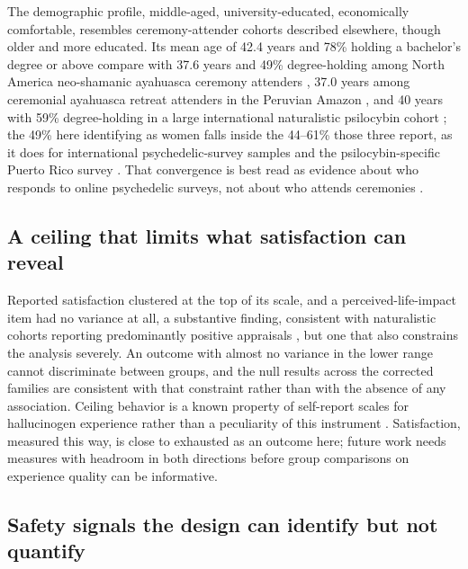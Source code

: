 \documentclass[12pt]{article}
\begin{document}
The demographic profile, middle-aged, university-educated, economically comfortable, resembles
ceremony-attender cohorts described elsewhere, though older and more educated. Its mean age of 42.4 years
and 78\% holding a bachelor's degree or above compare with 37.6 years and 49\% degree-holding among North
America neo-shamanic ayahuasca ceremony attenders \citep{pagni2025longterm}, 37.0 years among ceremonial
ayahuasca retreat attenders in the Peruvian Amazon \citep{ruffell2021ceremonial}, and 40 years with 59\%
degree-holding in a large international naturalistic psilocybin cohort \citep{nayak2023naturalistic}; the
49\% here identifying as women falls inside the 44--61\% those three report, as it does for international
psychedelic-survey samples \citep{kopra2023investigation,robinson2026field} and the
psilocybin-specific Puerto Rico survey \citep{velezrodriguez2026psilocybin}. That convergence is best read
as evidence about who responds to online psychedelic surveys, not about who attends ceremonies
\citep{bethlehem2010selection}.

\subsection{A ceiling that limits what satisfaction can reveal}

Reported satisfaction clustered at the top of its scale, and a perceived-life-impact item had no variance at
all, a substantive finding, consistent with naturalistic cohorts reporting predominantly positive appraisals
\citep{nayak2023naturalistic,ruffell2021ceremonial}, but one that also constrains the analysis severely. An
outcome with almost no variance in the lower range cannot discriminate between groups, and the null results
across the corrected families are consistent with that constraint rather than with the absence of any
association. Ceiling behavior is a known property of self-report scales for hallucinogen experience rather
than a peculiarity of this instrument \citep{bouso2016measuring}. Satisfaction, measured this way, is close
to exhausted as an outcome here; future work needs measures with headroom in both directions before group
comparisons on experience quality can be informative.

\subsection{Safety signals the design can identify but not quantify}
\end{document}
